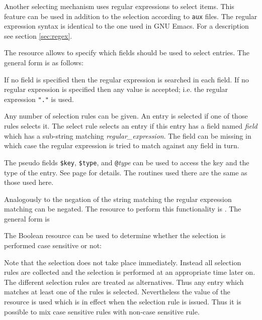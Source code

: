 \documentclass[11pt,a4paper]{scrbook}
\begin{document}
Another selecting mechanism uses regular expressions to select items. This
feature can be used in addition to the selection according to \texttt{aux}
files. The regular expression syntax is identical to the one used in GNU
Emacs. For a description see section \ref{sec:regex}.

The resource  allows to specify which fields should be used to
select entries. The general form is as follows:

\begin{Resources}
\end{Resources}

If no field is specified then the regular expression is searched in each
field. If no regular expression is specified then any value is accepted; i.e.
the regular expression \texttt{"."} is used.

Any number of selection rules can be given. An entry is selected if one of
those rules selects it. The select rule selects an entry if this entry has a
field named \emph{field} which has a sub-string matching
\emph{regular\_expression}. The field can be missing in which case the regular
expression is tried to match against any field in turn.

The pseudo fields \verb|$key|, \verb|$type|, and \verb|@|\emph{type} can be
used to access the key and the type of the entry. See page
\pageref{pseudo:key} for details. The routines used there are the same as
those used here.

Analogously to the negation of the string matching the regular expression
matching can be negated. The resource to perform this functionality is
. The general form is

\begin{Resources}
\end{Resources}


The Boolean resource  can be used to determine
whether the selection is performed case sensitive or not:

\begin{Resources}
\end{Resources}

Note that the selection does not take place immediately. Instead all selection
rules are collected and the selection is performed at an appropriate time
later on. The different selection rules are treated as alternatives. Thus any
entry which matches at least one of the rules is selected. Nevertheless the
value of the resource  is used which is in effect
when the selection rule is issued. Thus it is possible to mix case sensitive
rules with non-case sensitive rule.
\end{document}

